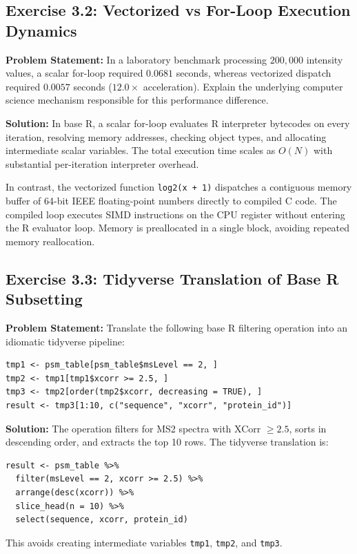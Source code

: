 \documentclass[11pt,twoside,openright]{book}
\begin{document}
\subsection*{Exercise 3.2: Vectorized vs For-Loop Execution Dynamics}
\noindent\textbf{Problem Statement:}\enspace
In a laboratory benchmark processing $200{,}000$ intensity values, a scalar for-loop required $0.0681$ seconds, whereas vectorized dispatch required $0.0057$ seconds ($12.0\times$ acceleration). Explain the underlying computer science mechanism responsible for this performance difference.

\noindent\textbf{Solution:}\enspace
In base R, a scalar for-loop evaluates R interpreter bytecodes on every iteration, resolving memory addresses, checking object types, and allocating intermediate scalar variables. The total execution time scales as $O(N)$ with substantial per-iteration interpreter overhead. 

In contrast, the vectorized function \texttt{log2(x + 1)} dispatches a contiguous memory buffer of 64-bit IEEE floating-point numbers directly to compiled C code. The compiled loop executes SIMD instructions on the CPU register without entering the R evaluator loop. Memory is preallocated in a single block, avoiding repeated memory reallocation.

\subsection*{Exercise 3.3: Tidyverse Translation of Base R Subsetting}
\noindent\textbf{Problem Statement:}\enspace
Translate the following base R filtering operation into an idiomatic tidyverse pipeline:
\begin{verbatim}
tmp1 <- psm_table[psm_table$msLevel == 2, ]
tmp2 <- tmp1[tmp1$xcorr >= 2.5, ]
tmp3 <- tmp2[order(tmp2$xcorr, decreasing = TRUE), ]
result <- tmp3[1:10, c("sequence", "xcorr", "protein_id")]
\end{verbatim}

\noindent\textbf{Solution:}\enspace
The operation filters for MS2 spectra with XCorr $\ge 2.5$, sorts in descending order, and extracts the top 10 rows. The tidyverse translation is:
\begin{verbatim}
result <- psm_table %>%
  filter(msLevel == 2, xcorr >= 2.5) %>%
  arrange(desc(xcorr)) %>%
  slice_head(n = 10) %>%
  select(sequence, xcorr, protein_id)
\end{verbatim}
This avoids creating intermediate variables \texttt{tmp1}, \texttt{tmp2}, and \texttt{tmp3}.
\end{document}
